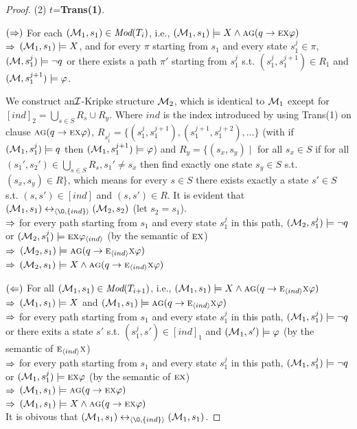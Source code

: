\documentclass[twoside,11pt]{article}
\begin{document}
\begin{proof}
		(2) $t$=\textbf{Trans(1)}.
		
		$(\Rightarrow)$ For each $({\cal M}_1,s_1) \in \textit{Mod}(T_i)$, i.e., $({\cal M}_1, s_1) \models X \wedge \textsc{a}\textsc{g}(q \rightarrow \textsc{e} \textsc{x} \varphi)$\\
		$\Rightarrow$ $({\cal M}_1,s_1)\models X$, and for every $\pi$ starting from $s_1$ and every state $s_1^j \in \pi$, $({\cal M},s_1^j) \models \neg q$ or there exists a path $\pi'$ starting from $s_1^j$ s.t.  $(s_1^j,s_1^{j+1})\in R_1$ and $({\cal M},s_1^{j+1})\models \varphi$.
		
		We construct an${\cal I}$-Kripke structure ${\cal M}_2$, which is identical to ${\cal M}_1$ except for $[ind]_2= \bigcup_{s\in S} R_s \cup R_y$. Where $ind$ is the index introduced by using Trans(1) on clause $\textsc{a}\textsc{g}(q \rightarrow \textsc{e} \textsc{x} \varphi)$, $R_{s_1^{j}}=\{(s_1^{j},s_1^{j+1}), (s_1^{j+1}, s_1^{j+2}),\dots\}$ (with if $({\cal M}_1, s_1^j) \models q$ then $({\cal M}_1, s_1^{j+1}) \models \varphi$) and $R_y=\{(s_x,s_y)\mid$ for all $s_x \in S$ if for all $(s_1',s_2')\in \bigcup_{s\in S} R_s, s_1'\neq s_x$ then find exactly one state $s_y\in S$ s.t. $(s_x,s_y)\in R\}$, which means for every $s\in S$ there exists exactly a state $s'\in S$ s.t. $(s,s')\in [ind]$ and $(s,s')\in R$. It is evident that $(\Hm_1, s_1) \lrto_{\tuple{{\O}, \{ind\}}} (\Hm_2, s_2)$ (let $s_2=s_1$).\\
		$\Rightarrow$ for every path starting from $s_1$ and every state $s_1^j$ in this path, $({\cal M}_2, s_1^j) \models \neg q$ or $({\cal M}_2, s_1^j)\models \textsc{e} \textsc{x} \varphi_{{\langle{ind}\rangle}}$ \hfill (by the semantic of $\textsc{e} \textsc{x}$)\\
		$\Rightarrow$ $({\cal M}_2, s_1) \models \textsc{a} \textsc{g}(q \rightarrow \textsc{e}_{{\langle{ind}\rangle}} \textsc{x} \varphi )$\\
		$\Rightarrow$ $({\cal M}_2, s_1) \models X \wedge \textsc{a} \textsc{g}(q \rightarrow \textsc{e}_{{\langle{ind}\rangle}} \textsc{x} \varphi )$
		
		$(\Leftarrow)$ For all $({\cal M}_1,s_1) \in \textit{Mod}(T_{i+1})$, i.e., $({\cal M}_1,s_1) \models X \wedge \textsc{a} \textsc{g}(q \rightarrow \textsc{e}_{{\langle{ind}\rangle}} \textsc{x} \varphi )$\\
		$\Rightarrow$ $({\cal M}_1,s_1) \models X$ and $({\cal M}_1,s_1) \models \textsc{a} \textsc{g}(q \rightarrow \textsc{e}_{{\langle{ind}\rangle}} \textsc{x} \varphi)$\\
		$\Rightarrow$ for every path starting from $s_1$ and every state $s_1^j$ in this path, $({\cal M}_1, s_1^j) \models \neg q$ or there exits a state $s'$ s.t. $(s_1^j, s')\in [ind]_1$ and $({\cal M}_1, s') \models \varphi$ \hfill (by the semantic of $\textsc{e}_{{\langle{ind}\rangle}} \textsc{x}$)\\
		$\Rightarrow$ for every path starting from $s_1$ and every state $s_1^j$ in this path, $({\cal M}_1, s_1^j) \models \neg q$ or $({\cal M}_1, s_1^j) \models \textsc{e} \textsc{x} \varphi$ \hfill (by the semantic of $\textsc{e} \textsc{x}$)\\
		$\Rightarrow$ $({\cal M}_1,s_1) \models \textsc{a}\textsc{g}(q \rightarrow \textsc{e} \textsc{x} \varphi)$\\
		$\Rightarrow$ $({\cal M}_1, s_1) \models X \wedge \textsc{a}\textsc{g}(q \rightarrow \textsc{e} \textsc{x} \varphi)$\\
		It is obivous that $(\Hm_1, s_1) \lrto_{\tuple{{\O}, \{ind\}}} (\Hm_1, s_1)$.
		

\end{proof}
\end{document}
